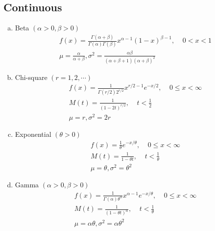 \documentclass{article}
\begin{document}
    \subsection{Continuous}
        \begin{enumerate}[(a)]
            \item Beta $(\alpha > 0, \beta > 0)$
            $$
            \begin{aligned}
                & f(x) = \frac{\Gamma(\alpha + \beta)}{\Gamma(\alpha)\Gamma(\beta)}x^{\alpha - 1}(1 - x)^{\beta - 1}, \;\;\;\; 0 < x < 1 \\
                & \mu = \frac{\alpha}{\alpha + \beta}, \sigma^2 = \frac{\alpha\beta}{(\alpha + \beta + 1)(\alpha + \beta)^2}
            \end{aligned}
            $$
            
            \item Chi-square $(r = 1, 2, \cdots)$
            $$
            \begin{aligned}
                & f(x) = \frac{1}{\Gamma(r / 2) 2^{r / 2}}x^{r / 2 - 1}e^{-x/2}, \;\;\;\; 0 \leq x < \infty \\
                & M(t) = \frac{1}{(1 - 2t)^{r / 2}}, \;\;\;\; t < \frac{1}{2} \\
                & \mu = r, \sigma^2 = 2r
            \end{aligned}
            $$
            
            \item Exponential $(\theta > 0)$
            $$
            \begin{aligned}
                & f(x) = \frac{1}{\theta}e^{-x/\theta}, \;\;\;\; 0 \leq x < \infty \\
                & M(t) = \frac{1}{1 - \theta t}, \;\;\;\; t < \frac{1}{\theta} \\
                & \mu = \theta, \sigma^2 = \theta^2
            \end{aligned}
            $$
            
            \item Gamma $(\alpha > 0, \beta > 0)$
            $$
            \begin{aligned}
                & f(x) = \frac{1}{\Gamma(\alpha)\theta^\alpha}x^{\alpha - 1}e^{-x/\theta}, \;\;\;\; 0 \leq x < \infty \\
                & M(t) = \frac{1}{(1 - \theta t)^\alpha}, \;\;\;\; t < \frac{1}{\theta} \\
                & \mu = \alpha\theta, \sigma^2 = \alpha\theta^2
            \end{aligned}
            $$
            

\end{enumerate}
\end{document}

